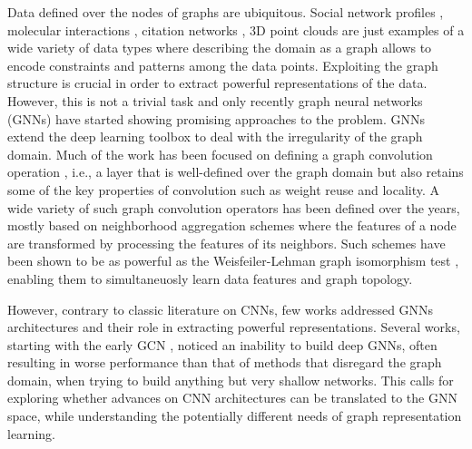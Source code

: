 \documentclass[10pt,twocolumn,twoside]{IEEEtran}
\begin{document}
Data defined over the nodes of graphs are ubiquitous. Social network profiles \cite{hamilton2017inductive}, molecular interactions \cite{duvenaud2015convolutional}, citation networks \cite{sen2008collective}, 3D point clouds \cite{simonovsky2017dynamic} are just examples of a wide variety of data types where describing the domain as a graph allows to encode constraints and patterns among the data points. Exploiting the graph structure is crucial in order to extract powerful representations of the data. However, this is not a trivial task and only recently graph neural networks (GNNs) have started showing promising approaches to the problem. GNNs  \cite{wu2020comprehensive} extend the deep learning toolbox to deal with the irregularity of the graph domain. Much of the work has been focused on defining a graph convolution operation \cite{bronstein2017geometric}, i.e., a layer that is well-defined over the graph domain but also retains some of the key properties of convolution such as weight reuse and locality.
A wide variety of such graph convolution operators has been defined over the years, mostly based on neighborhood aggregation schemes where the features of a node are transformed by processing the features of its neighbors. Such schemes have been shown to be as powerful as the Weisfeiler-Lehman graph isomorphism test \cite{weisfeiler,xu2018powerful}, enabling them to simultaneuosly learn data features and graph topology.

However, contrary to classic literature on CNNs, few works \cite{li2019deepgcnsjournal,dehmamy2019understanding,xu2018representation,dwivedi2020benchmarking} addressed GNNs architectures and their role in extracting powerful representations. Several works, starting with the early GCN \cite{kipf2016semi}, noticed an inability to build deep GNNs, often resulting in worse performance than that of methods that disregard the graph domain, when trying to build anything but very shallow networks. This calls for exploring whether advances on CNN architectures can be translated to the GNN space, while understanding the potentially different needs of graph representation learning.
\end{document}
